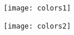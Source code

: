  
\begin{DoxyImageNoCaption}
  \mbox{\texttt{[image: colors1]}}
\end{DoxyImageNoCaption}
 
\begin{DoxyImageNoCaption}
  \mbox{\texttt{[image: colors2]}}
\end{DoxyImageNoCaption}
 